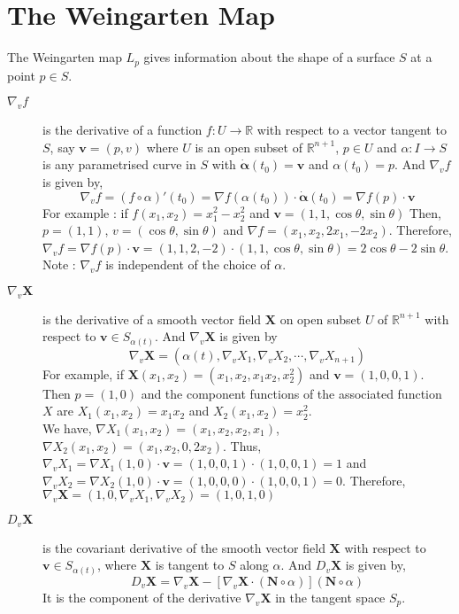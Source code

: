 \section{The Weingarten Map}
	The Weingarten map $L_p$ gives information about the shape of a surface $S$ at a point $p \in S$.
\begin{description}
	\item[$\nabla_v f$] is the derivative of a function $f : U \to \mathbb{R}$ with respect to a vector tangent to $S$, say $\mathbf{v} = (p,v)$ where $U$ is an open subset of $\mathbb{R}^{n+1}$, $p \in U$ and $\alpha : I \to S$ is any parametrised curve in $S$ with $\dot{\boldsymbol{\alpha}}(t_0) = \mathbf{v}$ and $\alpha(t_0) = p$. And $\nabla_v f$ is given by,
	$$ \nabla_v f = (f \circ \alpha)'(t_0) = \nabla f(\alpha(t_0)) \cdot \dot{\boldsymbol{\alpha}}(t_0) = \nabla f(p) \cdot \mathbf{v}$$
	For example : if $f(x_1,x_2) = x_1^2 - x_2^2$ and $\mathbf{v} = (1,1,\cos \theta, \sin \theta)$ Then, $p = (1,1)$, $v = (\cos \theta, \sin \theta)$ and $\nabla f = (x_1,x_2,2x_1,-2x_2)$. Therefore, $\nabla_v f = \nabla f(p) \cdot \mathbf{v} = (1,1,2,-2) \cdot (1,1,\cos \theta, \sin \theta) = 2\cos \theta -2 \sin \theta $.\\

	Note : $\nabla_v f$ is independent of the choice of $\alpha$.

\item[$\nabla_v \mathbf{X}$] is the derivative of a smooth vector field $\mathbf{X}$ on open subset $U$ of $\mathbb{R}^{n+1}$ with respect to $\mathbf{v} \in S_{\alpha(t)}$. And $\nabla_v \mathbf{X}$ is given by
	$$\nabla_v \mathbf{X} = \left(\alpha(t),\nabla_v X_1, \nabla_v X_2,\cdots, \nabla_v X_{n+1} \right) $$
	For example, if $\mathbf{X}(x_1,x_2) = (x_1,x_2,x_1x_2,x_2^2)$ and $\mathbf{v} = (1,0,0,1)$. Then $p = (1,0)$ and the component functions of the associated function $X$ are $X_1(x_1,x_2) = x_1x_2$ and $X_2(x_1,x_2) = x_2^2$.\\
		
	We have, $\nabla X_1(x_1,x_2) = (x_1,x_2,x_2,x_1)$, $\nabla X_2(x_1,x_2) = (x_1,x_2,0,2x_2)$. Thus, $\nabla_v X_1 = \nabla X_1(1,0) \cdot \mathbf{v} = (1,0,0,1) \cdot (1,0,0,1) = 1$ and\\ $\nabla_v X_2 = \nabla X_2(1,0) \cdot \mathbf{v} = (1,0,0,0) \cdot (1,0,0,1) = 0$. Therefore,\\ $\nabla_v \mathbf{X} = \left( 1,0,\nabla_v X_1,\nabla_v X_2 \right) = \left( 1,0,1,0 \right)$

\item[$D_v \mathbf{X}$] is the covariant derivative of the smooth vector field $\mathbf{X}$ with respect to $\mathbf{v} \in S_{\alpha(t)}$, where $\mathbf{X}$ is tangent to $S$ along $\alpha$. And $D_v \mathbf{X}$ is given by,
	$$D_v \mathbf{X} = \nabla_v \mathbf{X} - \left[ \nabla_v \mathbf{X} \cdot (\mathbf{N} \circ \alpha)\right] (\mathbf{N} \circ \alpha)$$
	It is the component of the derivative $\nabla_v \mathbf{X}$ in the tangent space $S_p$.
\end{description}

